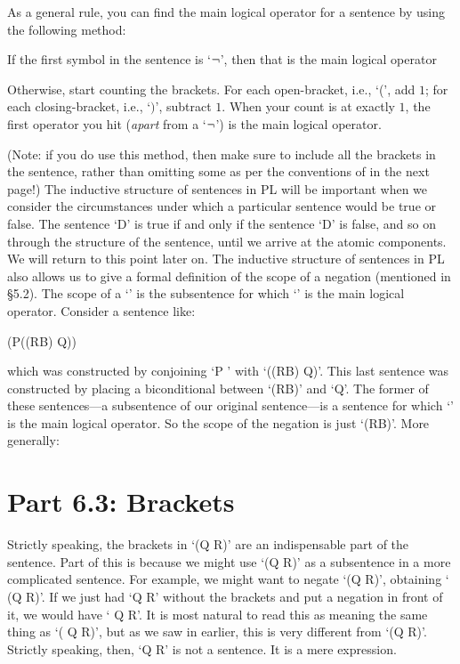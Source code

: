 As a general rule, you can find the main logical operator for a sentence by using the following method:
\begin{ebullet}
	\item[\textbullet] If the first symbol in the sentence is `$\neg$', then that is the main logical operator
	\item[\textbullet] Otherwise, start counting the brackets. For each open-bracket, i.e., `(', add $1$; for each closing-bracket, i.e., `$)$', subtract $1$. When your count is at exactly $1$, the first operator you hit (\emph{apart} from a `$\neg$') is the main logical operator.
\end{ebullet}
(Note: if you do use this method, then make sure to include all the brackets in the sentence, rather than omitting some as per the conventions of in the next page!)
The inductive structure of sentences in PL will be important when we consider the circumstances under which a particular sentence would be true or false. The sentence ‘\enot\enot\enot D’ is true if and only if the sentence ‘\enot\enot D’ is false, and so on through the structure of the sentence, until we arrive at the atomic components. We will return to this point later on.
The inductive structure of sentences in PL also allows us to give a formal definition of the scope of a negation (mentioned in §5.2). The scope of a ‘\enot’ is the subsentence for which ‘\enot’ is the main logical operator. Consider a sentence like:
\begin{center}(P\eand (\enot(R\eand B) \eiff  Q))\end{center}
which was constructed by conjoining ‘P ’ with ‘(\enot(R\eand B) \eiff  Q)’. This last sentence was constructed by placing a biconditional between ‘\enot(R\eand B)’ and ‘Q’. The former of these sentences—a subsentence of our original sentence—is a sentence for which ‘\enot’ is the main logical operator. So the scope of the negation is just ‘\enot(R\eand B)’. More generally:
\section{Part 6.3: Brackets}
Strictly speaking, the brackets in ‘(Q \eand  R)’ are an indispensable part of the sentence. Part of this is because we might use ‘(Q \eand R)’ as a subsentence in a more complicated sentence. For example, we might want to negate ‘(Q \eand  R)’, obtaining ‘ \enot (Q \eand  R)’. If we just had ‘Q \eand R’ without the brackets and put a negation in front of it, we would have ‘ \enot Q \eand  R’. It is most natural to read this as meaning the same thing as ‘( \enot Q \eand R)’, but as we saw in earlier, this is very different from ‘\enot(Q \eand  R)’.
Strictly speaking, then, ‘Q \eand  R’ is not a sentence. It is a mere expression.

